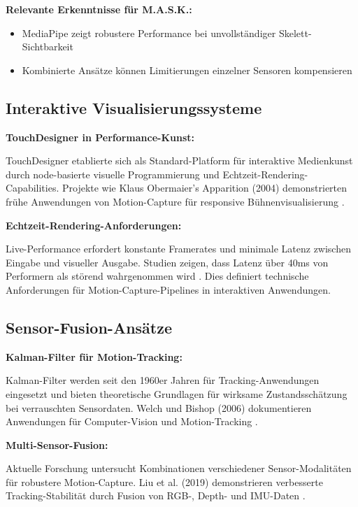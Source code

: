 \textbf{Relevante Erkenntnisse für M.A.S.K.:}
\begin{itemize}
    \item MediaPipe zeigt robustere Performance bei unvollständiger Skelett-Sichtbarkeit
    \item Kombinierte Ansätze können Limitierungen einzelner Sensoren kompensieren
\end{itemize}

\subsection{Interaktive Visualisierungssysteme}

\textbf{TouchDesigner in Performance-Kunst:}

\raggedright TouchDesigner etablierte sich als Standard-Platform für interaktive Medienkunst durch node-basierte visuelle Programmierung und Echtzeit-Rendering-Capabilities. Projekte wie Klaus Obermaier's \glqq Apparition\grqq{} (2004) demonstrierten frühe Anwendungen von Motion-Capture für responsive Bühnenvisualisierung \cite{obermaier2004apparition}.

\textbf{Echtzeit-Rendering-Anforderungen:}

\raggedright Live-Performance erfordert konstante Framerates und minimale Latenz zwischen Eingabe und visueller Ausgabe. Studien zeigen, dass Latenz über 40ms von Performern als störend wahrgenommen wird \cite{flach2004latency}. Dies definiert technische Anforderungen für Motion-Capture-Pipelines in interaktiven Anwendungen.

\subsection{Sensor-Fusion-Ansätze}

\textbf{Kalman-Filter für Motion-Tracking:}

\raggedright Kalman-Filter werden seit den 1960er Jahren für Tracking-Anwendungen eingesetzt und bieten theoretische Grundlagen für wirksame Zustandsschätzung bei verrauschten Sensordaten. Welch und Bishop (2006) dokumentieren Anwendungen für Computer-Vision und Motion-Tracking \cite{welch2006kalman}.

\textbf{Multi-Sensor-Fusion:}

\raggedright Aktuelle Forschung untersucht Kombinationen verschiedener Sensor-Modalitäten für robustere Motion-Capture. Liu et al. (2019) demonstrieren verbesserte Tracking-Stabilität durch Fusion von RGB-, Depth- und IMU-Daten \cite{liu2019multimodal}.

